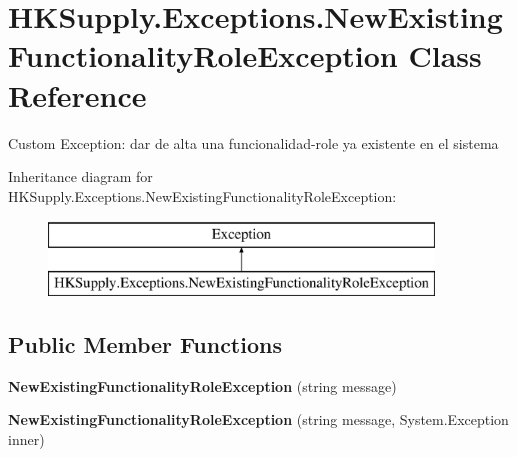 \hypertarget{class_h_k_supply_1_1_exceptions_1_1_new_existing_functionality_role_exception}{}\section{H\+K\+Supply.\+Exceptions.\+New\+Existing\+Functionality\+Role\+Exception Class Reference}
\label{class_h_k_supply_1_1_exceptions_1_1_new_existing_functionality_role_exception}


Custom Exception\+: dar de alta una funcionalidad-\/role ya existente en el sistema  


Inheritance diagram for H\+K\+Supply.\+Exceptions.\+New\+Existing\+Functionality\+Role\+Exception\+:\begin{figure}[H]
\begin{center}
\leavevmode
\includegraphics[height=2.000000cm]{class_h_k_supply_1_1_exceptions_1_1_new_existing_functionality_role_exception}
\end{center}
\end{figure}
\subsection*{Public Member Functions}
\begin{DoxyCompactItemize}
\item 
\mbox{\label{class_h_k_supply_1_1_exceptions_1_1_new_existing_functionality_role_exception_ae1ed7abcf4a622331f3e876b9ca2e37a}} 
{\bfseries New\+Existing\+Functionality\+Role\+Exception} (string message)
\item 
\mbox{\label{class_h_k_supply_1_1_exceptions_1_1_new_existing_functionality_role_exception_a2ee1d1ca9bde3637d664788761bf090d}} 
{\bfseries New\+Existing\+Functionality\+Role\+Exception} (string message, System.\+Exception inner)
\end{DoxyCompactItemize}
